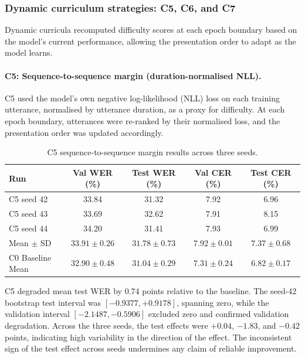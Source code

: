 \subsubsection{Dynamic curriculum strategies: C5, C6, and C7}

Dynamic curricula recomputed difficulty scores at each epoch boundary based on
the model's current performance, allowing the presentation order to adapt as the
model learns.

\paragraph{C5: Sequence-to-sequence margin (duration-normalised NLL).}

C5 used the model's own negative log-likelihood (NLL) loss on each training
utterance, normalised by utterance duration, as a proxy for difficulty. At each
epoch boundary, utterances were re-ranked by their normalised loss, and the
presentation order was updated accordingly.

\begin{table}[H]
\centering
\caption{C5 sequence-to-sequence margin results across three seeds.}
\label{tab:c5-s2s}
\begin{tabular}{lcccc}
\hline
\textbf{Run} & \textbf{Val WER (\%)} & \textbf{Test WER (\%)} & \textbf{Val CER (\%)} & \textbf{Test CER (\%)} \\
\hline
C5 seed 42 & 33.84 & 31.32 & 7.92 & 6.96 \\
C5 seed 43 & 33.69 & 32.62 & 7.91 & 8.15 \\
C5 seed 44 & 34.20 & 31.41 & 7.93 & 6.99 \\
\hline
Mean $\pm$ SD & $33.91 \pm 0.26$ & $31.78 \pm 0.73$ & $7.92 \pm 0.01$ & $7.37 \pm 0.68$ \\
\hline
C0 Baseline Mean & $32.90 \pm 0.48$ & $31.04 \pm 0.29$ & $7.31 \pm 0.24$ & $6.82 \pm 0.17$ \\
\hline
\end{tabular}
\end{table}

C5 degraded mean test WER by 0.74 points relative to the baseline. The seed-42
bootstrap test interval was $[-0.9377, +0.9178]$, spanning zero, while the
validation interval $[-2.1487, -0.5906]$ excluded zero and confirmed
validation degradation. Across the three seeds, the test effects were $+0.04$,
$-1.83$, and $-0.42$ points, indicating high variability in the direction of
the effect. The inconsistent sign of the test effect across seeds undermines any
claim of reliable improvement.

